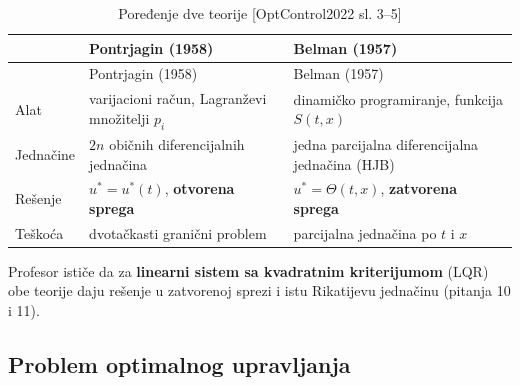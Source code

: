 \documentclass[11pt,a4paper,parskip=half,headsepline,numbers=noenddot]{scrartcl}
\DeclareRobustCommand{\izvor}[1]{{\small\color{izvorC}[#1]}}
\begin{document}
\begin{longtable}[]{@{}
  >{\raggedright\arraybackslash}p{}
  >{\raggedright\arraybackslash}p{}
  >{\raggedright\arraybackslash}p{}@{}}
\caption{Poređenje dve teorije \izvor{OptControl2022 sl. 3--5}}\tabularnewline
\toprule\noalign{}
\begin{minipage}[b]{\linewidth}\raggedright
\end{minipage} & \begin{minipage}[b]{\linewidth}\raggedright
Pontrjagin (1958)
\end{minipage} & \begin{minipage}[b]{\linewidth}\raggedright
Belman (1957)
\end{minipage} \\
\midrule\noalign{}
\endfirsthead
\toprule\noalign{}
\begin{minipage}[b]{\linewidth}\raggedright
\end{minipage} & \begin{minipage}[b]{\linewidth}\raggedright
Pontrjagin (1958)
\end{minipage} & \begin{minipage}[b]{\linewidth}\raggedright
Belman (1957)
\end{minipage} \\
\midrule\noalign{}
\endhead
\bottomrule\noalign{}
\endlastfoot
Alat & varijacioni račun, Lagranževi množitelji \(p_i\) & dinamičko programiranje, funkcija \(S(t, x)\) \\
Jednačine & \(2n\) običnih diferencijalnih jednačina & jedna parcijalna diferencijalna jednačina (HJB) \\
Rešenje & \(u^* = u^*(t)\), \textbf{otvorena sprega} & \(u^* = \Theta(t, x)\), \textbf{zatvorena sprega} \\
Teškoća & dvotačkasti granični problem & parcijalna jednačina po \(t\) i \(x\) \\
\end{longtable}

Profesor ističe da za \textbf{linearni sistem sa kvadratnim kriterijumom} (LQR) obe teorije daju rešenje u zatvorenoj sprezi i istu Rikatijevu jednačinu (pitanja 10 i 11).

\subsection{Problem optimalnog upravljanja}
\end{document}
